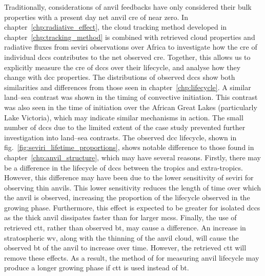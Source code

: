 
Traditionally, considerations of anvil feedbacks have only considered their bulk properties with a present day net anvil \acrshort{cre} of near zero.
In chapter~\ref{chp:radiative_effect}, the cloud tracking method developed in chapter~\ref{chp:tracking_method} is combined with retrieved cloud properties and radiative fluxes from \acrshort{seviri} observations over Africa to investigate how the \acrshort{cre} of individual \acrshort{dcc}s contributes to the net observed \acrshort{cre}. 
Together, this allows us to explicitly measure the \acrshort{cre} of \acrshort{dcc}s over their lifecycle, and analyse how they change with \acrshort{dcc} properties.
The distributions of observed \acrshort{dcc}s show both similarities and differences from those seen in chapter~\ref{chp:lifecycle}.
A similar land--sea contrast was shown in the timing of convective initiation.
This contrast was also seen in the time of initiation over the African Great Lakes (particularly Lake Victoria), which may indicate similar mechanisms in action.
The small number of \acrshort{dcc}s due to the limited extent of the case study prevented further investigation into land--sea contrasts.
The observed \acrshort{dcc} lifecycle, shown in fig.~\ref{fig:seviri_lifetime_proportions}, shows notable difference to those found in chapter~\ref{chp:anvil_structure}, which may have several reasons.
Firstly, there may be a difference in the lifecycle of \acrshort{dcc}s between the tropics and extra-tropics.
However, this difference may have been due to the lower sensitivity of \acrshort{seviri} for observing thin anvils.
This lower sensitivity reduces the length of time over which the anvil is observed, increasing the proportion of the lifecycle observed in the growing phase.
Furthermore, this effect is expected to be greater for isolated \acrshort{dcc}s as the thick anvil dissipates faster than for larger \acrshort{mcs}s.
Finally, the use of retrieved \acrshort{ctt}, rather than observed \acrshort{bt}, may cause a difference.
An increase in stratospheric \acrshort{wv}, along with the thinning of the anvil cloud, will cause the observed \acrshort{bt} of the anvil to increase over time.
However, the retrieved \acrshort{ctt} will remove these effects.
As a result, the method of \citet{futyan_deep_2007} for measuring anvil lifecycle may produce a longer growing phase if \acrshort{ctt} is used instead of \acrshort{bt}.

